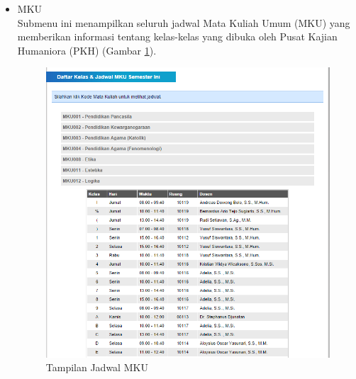 \begin{enumerate}
\begin{itemize}
\begin{itemize}
			\item MKU \\
			Submenu ini menampilkan seluruh jadwal Mata Kuliah Umum (MKU) yang memberikan informasi tentang kelas-kelas yang dibuka oleh Pusat Kajian Humaniora (PKH) (Gambar \ref{fig:3_pam_utama_jadwalmku}). 
			\begin{figure}[H]
				\centering
				\includegraphics[scale=0.5]{Gambar/pam-utama-jadwalmku}
				\caption{Tampilan Jadwal MKU} 
				\label{fig:3_pam_utama_jadwalmku}
			\end{figure}
			

\end{itemize}
\end{itemize}
\end{enumerate}
